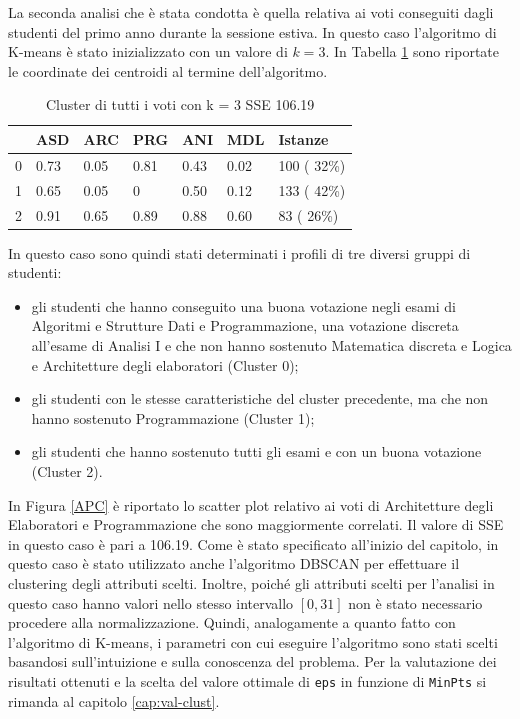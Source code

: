 \documentclass[12pt]{article}
\begin{document}
La seconda analisi che è stata condotta è quella relativa ai voti conse\-guiti dagli studenti del primo anno durante la sessione estiva. In questo caso l'algoritmo di K-means è stato inizializzato con un valore di $k=3$.
In Tabella \ref{c3V} sono riportate le coordinate dei centroidi al termine dell'algori\-tmo. 
\begin{table}[ht]
	\centering
	\begin{tabular}{@{}lllllll@{}}
	\toprule
	  & ASD  & ARC  & PRG & ANI  & MDL  & Istanze      \\ \midrule
	0 & 0.73 & 0.05 & 0.81& 0.43 & 0.02 &  100  ( 32\%)\\
	1 & 0.65 & 0.05 & 0   & 0.50 & 0.12 &  133 ( 42\%) \\
	2 & 0.91 & 0.65 & 0.89& 0.88 & 0.60 &  83  ( 26\%) \\ \bottomrule
	\end{tabular}
	\caption{Cluster di tutti i voti con k = 3 SSE 106.19}
	\label{c3V}
\end{table}
In questo caso sono quindi stati determinati i profili di tre diversi gruppi di studenti:
\begin{itemize}
\item gli studenti che hanno conseguito una buona votazione negli esami di Algoritmi e Strutture Dati e Programmazione,
una votazione dis\-creta all'esame di Analisi I e che non hanno sostenuto Matematica discreta e Logica e Architetture degli elaboratori (Cluster 0);
\item gli studenti con le stesse caratteristiche del cluster precedente, ma che non hanno sostenuto Programmazione (Cluster 1);
\item gli studenti che hanno sostenuto tutti gli esami e con un buona vota\-zione (Cluster 2).
\end{itemize}
In Figura \ref{APC} è riportato lo scatter plot relativo ai voti di Architetture degli Elaboratori e Programmazione che sono
maggiormente correlati. Il valore di SSE in questo caso è pari a 106.19. 
Come è stato specificato all'inizio del capitolo, in questo caso è stato utilizzato anche l'algoritmo DBSCAN per effettuare il clustering degli attributi scelti. 
Inoltre, poiché gli attributi scelti per l'analisi in questo caso hanno valori nello stesso intervallo $[0,31]$ non è stato necessario procedere alla normalizzazione. 
Quindi, analoga\-mente a quanto fatto con l'algoritmo di K-means, i parametri con cui ese\-guire l'algoritmo sono stati scelti basandosi sull'intuizione e sulla cono\-scenza del problema. 
Per la valutazione dei risultati ottenuti e la scelta del valore ottimale di \texttt{eps} in funzione di \texttt{MinPts} si rimanda al capitolo \ref{cap:val-clust}. 
\end{document}
